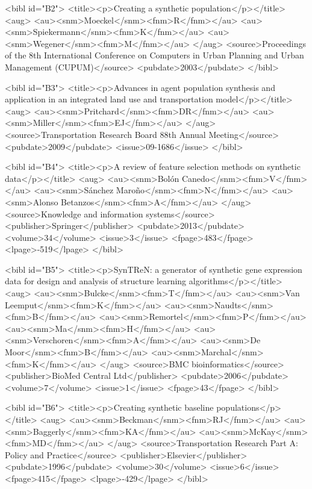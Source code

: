 \documentclass{bmcart}
\begin{document}
\begin{backmatter}
{<bibl id="B2">
  <title><p>Creating a synthetic population</p></title>
  <aug>
    <au><snm>Moeckel</snm><fnm>R</fnm></au>
    <au><snm>Spiekermann</snm><fnm>K</fnm></au>
    <au><snm>Wegener</snm><fnm>M</fnm></au>
  </aug>
  <source>Proceedings of the 8th International Conference on Computers in Urban
  Planning and Urban Management (CUPUM)</source>
  <pubdate>2003</pubdate>
</bibl>

<bibl id="B3">
  <title><p>Advances in agent population synthesis and application in an
  integrated land use and transportation model</p></title>
  <aug>
    <au><snm>Pritchard</snm><fnm>DR</fnm></au>
    <au><snm>Miller</snm><fnm>EJ</fnm></au>
  </aug>
  <source>Transportation Research Board 88th Annual Meeting</source>
  <pubdate>2009</pubdate>
  <issue>09-1686</issue>
</bibl>

<bibl id="B4">
  <title><p>A review of feature selection methods on synthetic data</p></title>
  <aug>
    <au><snm>Bol{\'o}n Canedo</snm><fnm>V</fnm></au>
    <au><snm>S{\'a}nchez Maro{\~n}o</snm><fnm>N</fnm></au>
    <au><snm>Alonso Betanzos</snm><fnm>A</fnm></au>
  </aug>
  <source>Knowledge and information systems</source>
  <publisher>Springer</publisher>
  <pubdate>2013</pubdate>
  <volume>34</volume>
  <issue>3</issue>
  <fpage>483</fpage>
  <lpage>-519</lpage>
</bibl>

<bibl id="B5">
  <title><p>SynTReN: a generator of synthetic gene expression data for design
  and analysis of structure learning algorithms</p></title>
  <aug>
    <au><snm>Bulcke</snm><fnm>T</fnm></au>
    <au><snm>Van Leemput</snm><fnm>K</fnm></au>
    <au><snm>Naudts</snm><fnm>B</fnm></au>
    <au><snm>Remortel</snm><fnm>P</fnm></au>
    <au><snm>Ma</snm><fnm>H</fnm></au>
    <au><snm>Verschoren</snm><fnm>A</fnm></au>
    <au><snm>De Moor</snm><fnm>B</fnm></au>
    <au><snm>Marchal</snm><fnm>K</fnm></au>
  </aug>
  <source>BMC bioinformatics</source>
  <publisher>BioMed Central Ltd</publisher>
  <pubdate>2006</pubdate>
  <volume>7</volume>
  <issue>1</issue>
  <fpage>43</fpage>
</bibl>

<bibl id="B6">
  <title><p>Creating synthetic baseline populations</p></title>
  <aug>
    <au><snm>Beckman</snm><fnm>RJ</fnm></au>
    <au><snm>Baggerly</snm><fnm>KA</fnm></au>
    <au><snm>McKay</snm><fnm>MD</fnm></au>
  </aug>
  <source>Transportation Research Part A: Policy and Practice</source>
  <publisher>Elsevier</publisher>
  <pubdate>1996</pubdate>
  <volume>30</volume>
  <issue>6</issue>
  <fpage>415</fpage>
  <lpage>-429</lpage>
</bibl>

}
\end{backmatter}
\end{document}
